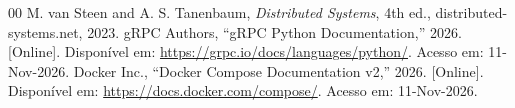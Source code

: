 \documentclass[conference]{IEEEtran}
\begin{document}
\begin{thebibliography}{00}
 M. van Steen and A. S. Tanenbaum, \textit{Distributed Systems}, 4th ed., distributed-systems.net, 2023.
 gRPC Authors, ``gRPC Python Documentation,'' 2026. [Online]. Disponível em: \url{https://grpc.io/docs/languages/python/}. Acesso em: 11-Nov-2026.
 Docker Inc., ``Docker Compose Documentation v2,'' 2026. [Online]. Disponível em: \url{https://docs.docker.com/compose/}. Acesso em: 11-Nov-2026.
\end{thebibliography}
\end{document}
